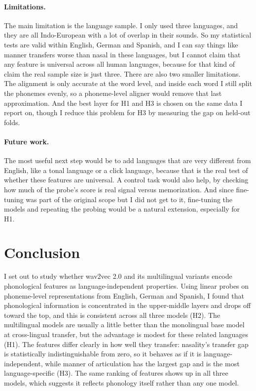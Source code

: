 \documentclass[twoside,11pt]{article}
\begin{document}
\paragraph{Limitations.}
The main limitation is the language sample. I only used three languages, and they
are all Indo-European with a lot of overlap in their sounds. So my statistical
tests are valid within English, German and Spanish, and I can say things like
manner transfers worse than nasal in these languages, but I cannot claim that any
feature is universal across all human languages, because for that kind of claim
the real sample size is just three. There are also two smaller limitations. The
alignment is only accurate at the word level, and inside each word I still split
the phonemes evenly, so a phoneme-level aligner would remove that last
approximation. And the best layer for H1 and H3 is chosen on the same data I
report on, though I reduce this problem for H3 by measuring the gap on held-out
folds.

\paragraph{Future work.}
The most useful next step would be to add languages that are very different from
English, like a tonal language or a click language, because that is the real test
of whether these features are universal. A control task \citep{hewitt2019control}
would also help, by checking how much of the probe's score is real signal versus
memorization. And since fine-tuning was part of the original scope but I did not
get to it, fine-tuning the models and repeating the probing would be a natural
extension, especially for H1.

\section{Conclusion}

I set out to study whether wav2vec 2.0 and its multilingual variants encode
phonological features as language-independent properties. Using linear probes on
phoneme-level representations from English, German and Spanish, I found that
phonological information is concentrated in the upper-middle layers and drops off
toward the top, and this is consistent across all three models (H2). The
multilingual models are usually a little better than the monolingual base model at
cross-lingual transfer, but the advantage is modest for these related languages
(H1). The features differ clearly in how well they transfer: nasality's transfer
gap is statistically indistinguishable from zero, so it behaves as if it is
language-independent, while manner of articulation has the largest gap and is the
most language-specific (H3). The same ranking of features shows up in all three
models, which suggests it reflects phonology itself rather than any one model.
\end{document}
